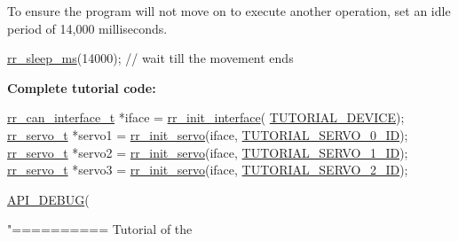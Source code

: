 \begin{DoxyEnumerate}
\item To ensure the program will not move on to execute another operation, set an idle period of 14,000 milliseconds. 
\begin{DoxyCodeInclude}
    \hyperlink{group___aux_gaeb26028b83635e028ebc901e1cbf33a1}{rr\_sleep\_ms}(14000); \textcolor{comment}{// wait till the movement ends}
\end{DoxyCodeInclude}
 {\bfseries  Complete tutorial code\+: } 
\begin{DoxyCodeInclude}
    \hyperlink{structrr__can__interface__t}{rr\_can\_interface\_t} *iface = \hyperlink{group___init_ga472a4890dcc7d7a13123c56a06946d91}{rr\_init\_interface}(
      \hyperlink{tutorial_8h_a90947332a0345dc693905e3fc04dbeb2}{TUTORIAL\_DEVICE});
    \hyperlink{structrr__servo__t}{rr\_servo\_t} *servo1 = \hyperlink{group___init_ga0adb313a3eeb8a4399431e940a1f3e9e}{rr\_init\_servo}(iface, 
      \hyperlink{tutorial_8h_a9a3d33f25d3a72a8e30c885d238b3b65}{TUTORIAL\_SERVO\_0\_ID});
    \hyperlink{structrr__servo__t}{rr\_servo\_t} *servo2 = \hyperlink{group___init_ga0adb313a3eeb8a4399431e940a1f3e9e}{rr\_init\_servo}(iface, 
      \hyperlink{tutorial_8h_a525a6de936d69ba937949199d94ab568}{TUTORIAL\_SERVO\_1\_ID});
    \hyperlink{structrr__servo__t}{rr\_servo\_t} *servo3 = \hyperlink{group___init_ga0adb313a3eeb8a4399431e940a1f3e9e}{rr\_init\_servo}(iface, 
      \hyperlink{tutorial_8h_a363c977793cfbddce5486c10ef5b5a87}{TUTORIAL\_SERVO\_2\_ID});

    \hyperlink{api_8h_a0e4aafa2ca9bd25219713176906b7c40}{API\_DEBUG}(\textcolor{stringliteral}{"========== Tutorial of the %

}
\end{DoxyCodeInclude}
\end{DoxyEnumerate}
